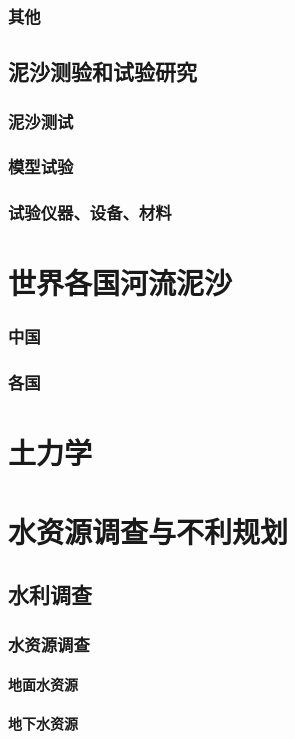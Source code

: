 \documentclass[UTF8]{../../ApplicationUniverse}
\begin{document}
        \subsubsection{其他}
    \subsection{泥沙测验和试验研究}
        \subsubsection{泥沙测试}
        \subsubsection{模型试验}
        \subsubsection{试验仪器、设备、材料}
\section{世界各国河流泥沙}
    \subsubsection{中国}
    \subsubsection{各国}
\section{土力学}
\section{水资源调查与不利规划}
    \subsection{水利调查}
        \subsubsection{水资源调查}
            \paragraph{地面水资源}
            \paragraph{地下水资源}
\end{document}
